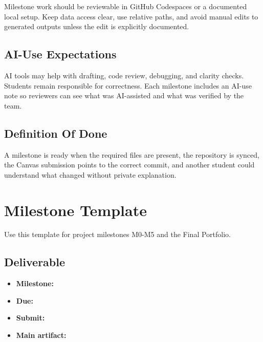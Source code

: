 \documentclass[
  letterpaper,
  DIV=11,
  numbers=noendperiod,
  oneside]{scrreprt}
\providecommand{\tightlist}{%
  \setlength{\itemsep}{0pt}\setlength{\parskip}{0pt}}
\begin{document}

Milestone work should be reviewable in GitHub Codespaces or a documented
local setup. Keep data access clear, use relative paths, and avoid
manual edits to generated outputs unless the edit is explicitly
documented.

\section*{AI-Use Expectations}\label{ai-use-expectations}


AI tools may help with drafting, code review, debugging, and clarity
checks. Students remain responsible for correctness. Each milestone
includes an AI-use note so reviewers can see what was AI-assisted and
what was verified by the team.

\section*{Definition Of Done}\label{definition-of-done-1}


A milestone is ready when the required files are present, the repository
is synced, the Canvas submission points to the correct commit, and
another student could understand what changed without private
explanation.

\chapter*{Milestone Template}\label{milestone-template}


Use this template for project milestones M0-M5 and the Final Portfolio.

\section*{Deliverable}\label{deliverable}


\begin{itemize}
\tightlist
\item
  \textbf{Milestone:}
\item
  \textbf{Due:}
\item
  \textbf{Submit:}
\item
  \textbf{Main artifact:}
\end{itemize}
\end{document}
